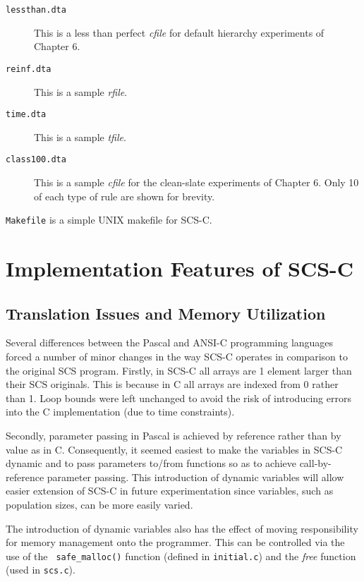 \begin{description}
\item[\verb!lessthan.dta!] This is a less than perfect 
{\it cfile} for default  hierarchy experiments of Chapter 6.

\item[\verb!reinf.dta!] This is a sample {\it rfile}.

\item[\verb!time.dta!] This is a sample {\it tfile}.

\item[\verb!class100.dta!] This is a sample {\it cfile} for
the clean-slate experiments of Chapter 6. Only 10 of each
type of rule are shown for brevity.


\end{description}



\verb!Makefile! is a simple UNIX makefile for SCS-C.

\section{Implementation Features of SCS-C}

\subsection{Translation Issues and Memory Utilization}

  Several differences between the Pascal and ANSI-C
programming languages forced a number of minor changes in the
way SCS-C operates in comparison to the original SCS program.
Firstly, in SCS-C all arrays are 1 element larger than their
SCS originals. This is because in C all arrays are indexed
from 0 rather than 1. Loop bounds were left unchanged to avoid
the risk of introducing errors into the C implementation (due
to time constraints).

  Secondly, parameter passing in Pascal is achieved by
reference rather than by value as in C. Consequently, it
seemed easiest to make the variables in SCS-C dynamic and to
pass parameters to/from functions so as to achieve
call-by-reference parameter passing. This introduction of
dynamic variables will allow easier extension of SCS-C in
future experimentation since variables, such as population
sizes, can be more easily varied. 

  The introduction of dynamic variables also has the effect of
moving responsibility for memory management onto the
programmer. This can be controlled via the use of the {\tt
safe\_malloc()}  function (defined in {\tt initial.c}) and 
the {\it free} function (used in {\tt scs.c}).


